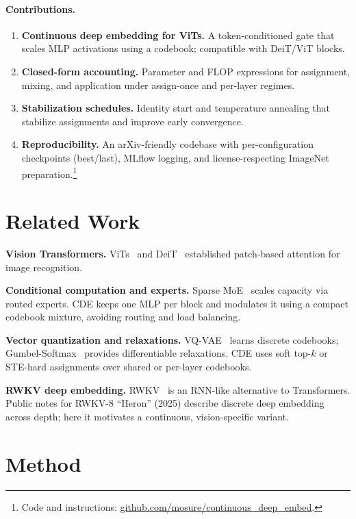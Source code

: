 \documentclass[11pt]{article}
\begin{document}
\paragraph{Contributions.}
\begin{enumerate}
  \item \textbf{Continuous deep embedding for ViTs.} A token-conditioned gate that scales MLP activations using a codebook; compatible with DeiT/ViT blocks.
  \item \textbf{Closed-form accounting.} Parameter and FLOP expressions for assignment, mixing, and application under assign-once and per-layer regimes.
  \item \textbf{Stabilization schedules.} Identity start and temperature annealing that stabilize assignments and improve early convergence.
  \item \textbf{Reproducibility.} An arXiv-friendly codebase with per-configuration checkpoints (best/last), MLflow logging, and license-respecting ImageNet preparation.\footnote{Code and instructions: \href{https://github.com/mosure/continuous_deep_embed}{github.com/mosure/continuous\_deep\_embed}.}
\end{enumerate}

\section{Related Work}
\textbf{Vision Transformers.} ViTs~\citep{dosovitskiy2020vit} and DeiT~\citep{touvron2020deit} established patch-based attention for image recognition.

\textbf{Conditional computation and experts.} Sparse MoE~\citep{shazeer2017moe,fedus2021switch} scales capacity via routed experts. CDE keeps one MLP per block and modulates it using a compact codebook mixture, avoiding routing and load balancing.

\textbf{Vector quantization and relaxations.} VQ-VAE~\citep{oord2017vqvae} learns discrete codebooks; Gumbel-Softmax~\citep{jang2017gumbel,maddison2017concrete} provides differentiable relaxations. CDE uses soft top-$k$ or STE-hard assignments over shared or per-layer codebooks.

\textbf{RWKV deep embedding.} RWKV~\citep{peng2023rwkv} is an RNN-like alternative to Transformers. Public notes for RWKV-8 ``Heron'' (2025) describe discrete deep embedding across depth; here it motivates a continuous, vision-specific variant.

\section{Method}
\end{document}
